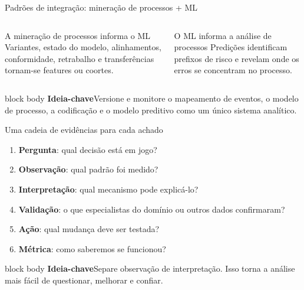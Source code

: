 \documentclass[aspectratio=169,11pt]{beamer}
\newcommand{\keyidea}[1]{%
  \begin{beamercolorbox}[rounded=true,sep=0.65em]{block body}
    \textbf{\color{Teal}Ideia-chave}\quad #1
  \end{beamercolorbox}
}
\begin{document}
\begin{frame}{Padrões de integração: mineração de processos + ML}
  \small
  \begin{columns}[T,onlytextwidth]
      \begin{block}{A mineração de processos informa o ML}
        Variantes, estado do modelo, alinhamentos, conformidade, retrabalho e transferências tornam-se features ou coortes.
      \end{block}
      \begin{block}{O ML informa a análise de processos}
        Predições identificam prefixos de risco e revelam onde os erros se concentram no processo.
      \end{block}
      \centering
  \end{columns}
  \vspace{0.1cm}
  \keyidea{Versione e monitore o mapeamento de eventos, o modelo de processo, a codificação e o modelo preditivo como um único sistema analítico.}
\end{frame}

\begin{frame}{Uma cadeia de evidências para cada achado}
  \begin{enumerate}
    \item \textbf{Pergunta}: qual decisão está em jogo?
    \item \textbf{Observação}: qual padrão foi medido?
    \item \textbf{Interpretação}: qual mecanismo pode explicá-lo?
    \item \textbf{Validação}: o que especialistas do domínio ou outros dados confirmaram?
    \item \textbf{Ação}: qual mudança deve ser testada?
    \item \textbf{Métrica}: como saberemos se funcionou?
  \end{enumerate}
  \vspace{0.35cm}
  \keyidea{Separe observação de interpretação. Isso torna a análise mais fácil de questionar, melhorar e confiar.}
\end{frame}
\end{document}
